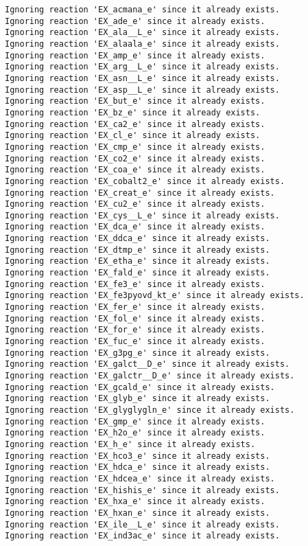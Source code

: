 \documentclass[
  letterpaper,
  DIV=11,
  numbers=noendperiod]{scrartcl}
\begin{document}
\begin{verbatim}
Ignoring reaction 'EX_acmana_e' since it already exists.
Ignoring reaction 'EX_ade_e' since it already exists.
Ignoring reaction 'EX_ala__L_e' since it already exists.
Ignoring reaction 'EX_alaala_e' since it already exists.
Ignoring reaction 'EX_amp_e' since it already exists.
Ignoring reaction 'EX_arg__L_e' since it already exists.
Ignoring reaction 'EX_asn__L_e' since it already exists.
Ignoring reaction 'EX_asp__L_e' since it already exists.
Ignoring reaction 'EX_but_e' since it already exists.
Ignoring reaction 'EX_bz_e' since it already exists.
Ignoring reaction 'EX_ca2_e' since it already exists.
Ignoring reaction 'EX_cl_e' since it already exists.
Ignoring reaction 'EX_cmp_e' since it already exists.
Ignoring reaction 'EX_co2_e' since it already exists.
Ignoring reaction 'EX_coa_e' since it already exists.
Ignoring reaction 'EX_cobalt2_e' since it already exists.
Ignoring reaction 'EX_creat_e' since it already exists.
Ignoring reaction 'EX_cu2_e' since it already exists.
Ignoring reaction 'EX_cys__L_e' since it already exists.
Ignoring reaction 'EX_dca_e' since it already exists.
Ignoring reaction 'EX_ddca_e' since it already exists.
Ignoring reaction 'EX_dtmp_e' since it already exists.
Ignoring reaction 'EX_etha_e' since it already exists.
Ignoring reaction 'EX_fald_e' since it already exists.
Ignoring reaction 'EX_fe3_e' since it already exists.
Ignoring reaction 'EX_fe3pyovd_kt_e' since it already exists.
Ignoring reaction 'EX_fer_e' since it already exists.
Ignoring reaction 'EX_fol_e' since it already exists.
Ignoring reaction 'EX_for_e' since it already exists.
Ignoring reaction 'EX_fuc_e' since it already exists.
Ignoring reaction 'EX_g3pg_e' since it already exists.
Ignoring reaction 'EX_galct__D_e' since it already exists.
Ignoring reaction 'EX_galctr__D_e' since it already exists.
Ignoring reaction 'EX_gcald_e' since it already exists.
Ignoring reaction 'EX_glyb_e' since it already exists.
Ignoring reaction 'EX_glyglygln_e' since it already exists.
Ignoring reaction 'EX_gmp_e' since it already exists.
Ignoring reaction 'EX_h2o_e' since it already exists.
Ignoring reaction 'EX_h_e' since it already exists.
Ignoring reaction 'EX_hco3_e' since it already exists.
Ignoring reaction 'EX_hdca_e' since it already exists.
Ignoring reaction 'EX_hdcea_e' since it already exists.
Ignoring reaction 'EX_hishis_e' since it already exists.
Ignoring reaction 'EX_hxa_e' since it already exists.
Ignoring reaction 'EX_hxan_e' since it already exists.
Ignoring reaction 'EX_ile__L_e' since it already exists.
Ignoring reaction 'EX_ind3ac_e' since it already exists.

\end{verbatim}
\end{document}
